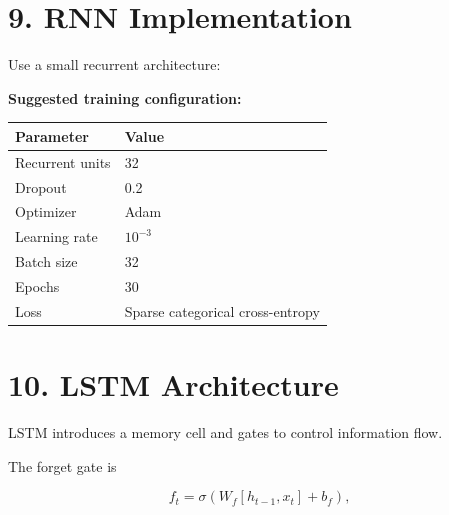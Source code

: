 \documentclass[10pt]{article}
\begin{document}
\section*{9. RNN Implementation}

Use a small recurrent architecture:

\begin{center}
\end{center}

\textbf{Suggested training configuration:}

\begin{center}
\begin{tabular}{|l|l|}
\hline
Parameter & Value\\
\hline
Recurrent units & 32\\
Dropout & 0.2\\
Optimizer & Adam\\
Learning rate & $10^{-3}$\\
Batch size & 32\\
Epochs & 30\\
Loss & Sparse categorical cross-entropy\\
\hline
\end{tabular}
\end{center}

\section*{10. LSTM Architecture}

LSTM introduces a memory cell and gates to control information flow.

The forget gate is

\[
f_t=\sigma(W_f[h_{t-1},x_t]+b_f),
\]
\end{document}
